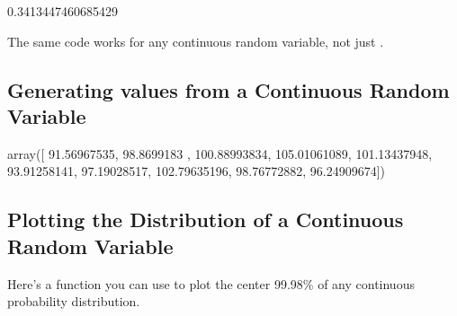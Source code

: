 \documentclass[letterpaper,10pt,english]{jupyterBook}
\begin{document}
\begin{sphinxVerbatim}[commandchars=\\\{\}]
0.3413447460685429
\end{sphinxVerbatim}

\sphinxAtStartPar
The same code works for any continuous random variable, not just .


\subsection{Generating values from a Continuous Random Variable}
\label{\detokenize{GB213-review-in-Python:generating-values-from-a-continuous-random-variable}}
\begin{sphinxVerbatim}[commandchars=\\\{\}]
    
\end{sphinxVerbatim}

\begin{sphinxVerbatim}[commandchars=\\\{\}]
array([ 91.56967535,  98.8699183 , 100.88993834, 105.01061089,
       101.13437948,  93.91258141,  97.19028517, 102.79635196,
        98.76772882,  96.24909674])
\end{sphinxVerbatim}


\subsection{Plotting the Distribution of a Continuous Random Variable}
\label{\detokenize{GB213-review-in-Python:plotting-the-distribution-of-a-continuous-random-variable}}
\sphinxAtStartPar
Here’s a function you can use to plot the center 99.98\% of any continuous probability distribution.

\begin{sphinxVerbatim}[commandchars=\\\{\}]
    
            
          
        
       
\end{sphinxVerbatim}
\end{document}
